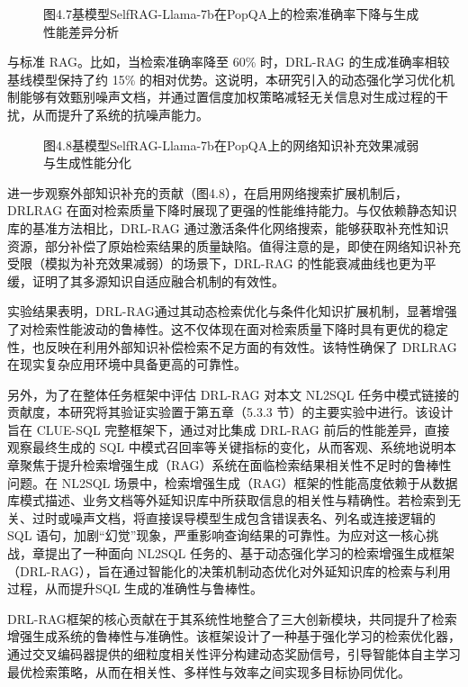 \documentclass[12pt,a4paper,openright,UTF8]{ctexbook}
\begin{document}
\begin{figure}[htbp]
\centering
{}
\caption{图4.7基模型SelfRAG-Llama-7b在PopQA上的检索准确率下降与生成性能差异分析}
\end{figure}

与标准 RAG。比如，当检索准确率降至 60\% 时，DRL-RAG 的生成准确率相较基线模型保持了约 15\% 的相对优势。这说明，本研究引入的动态强化学习优化机制能够有效甄别噪声文档，并通过置信度加权策略减轻无关信息对生成过程的干扰，从而提升了系统的抗噪声能力。

\begin{figure}[htbp]
\centering
{}
\caption{图4.8基模型SelfRAG-Llama-7b在PopQA上的网络知识补充效果减弱与生成性能分化}
\end{figure}

进一步观察外部知识补充的贡献（图4.8），在启用网络搜索扩展机制后，DRLRAG 在面对检索质量下降时展现了更强的性能维持能力。与仅依赖静态知识库的基准方法相比，DRL-RAG 通过激活条件化网络搜索，能够获取补充性知识资源，部分补偿了原始检索结果的质量缺陷。值得注意的是，即使在网络知识补充受限（模拟为补充效果减弱）的场景下，DRL-RAG 的性能衰减曲线也更为平缓，证明了其多源知识自适应融合机制的有效性。


实验结果表明，DRL-RAG通过其动态检索优化与条件化知识扩展机制，显著增强了对检索性能波动的鲁棒性。这不仅体现在面对检索质量下降时具有更优的稳定性，也反映在利用外部知识补偿检索不足方面的有效性。该特性确保了 DRLRAG 在现实复杂应用环境中具备更高的可靠性。


另外，为了在整体任务框架中评估 DRL-RAG 对本文 NL2SQL 任务中模式链接的贡献度，本研究将其验证实验置于第五章（5.3.3 节）的主要实验中进行。该设计旨在 CLUE-SQL 完整框架下，通过对比集成 DRL-RAG 前后的性能差异，直接观察最终生成的 SQL 中模式召回率等关键指标的变化，从而客观、系统地说明本章聚焦于提升检索增强生成（RAG）系统在面临检索结果相关性不足时的鲁棒性问题。在 NL2SQL 场景中，检索增强生成（RAG）框架的性能高度依赖于从数据库模式描述、业务文档等外延知识库中所获取信息的相关性与精确性。若检索到无关、过时或噪声文档，将直接误导模型生成包含错误表名、列名或连接逻辑的 SQL 语句，加剧“幻觉”现象，严重影响查询结果的可靠性。为应对这一核心挑战，章提出了一种面向 NL2SQL 任务的、基于动态强化学习的检索增强生成框架（DRL-RAG），旨在通过智能化的决策机制动态优化对外延知识库的检索与利用过程，从而提升SQL 生成的准确性与鲁棒性。


DRL-RAG框架的核心贡献在于其系统性地整合了三大创新模块，共同提升了检索增强生成系统的鲁棒性与准确性。该框架设计了一种基于强化学习的检索优化器，通过交叉编码器提供的细粒度相关性评分构建动态奖励信号，引导智能体自主学习最优检索策略，从而在相关性、多样性与效率之间实现多目标协同优化。
\end{document}
